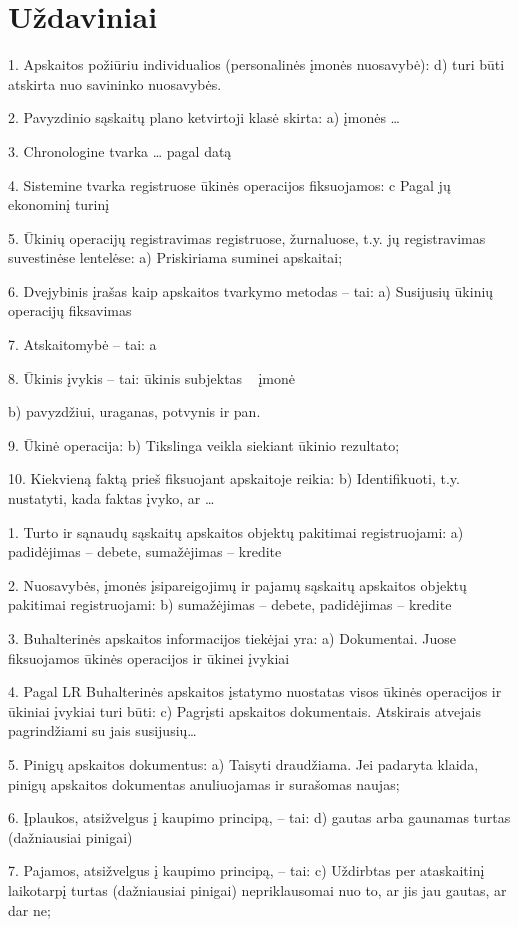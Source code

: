 \chapter{Uždaviniai}

1. Apskaitos požiūriu individualios (personalinės įmonės nuosavybė):
d) turi būti atskirta nuo savininko nuosavybės.

2. Pavyzdinio sąskaitų plano ketvirtoji klasė skirta:
a) įmonės …

3. Chronologine tvarka …
pagal datą

4. Sistemine tvarka registruose ūkinės operacijos fiksuojamos:
c Pagal jų ekonominį turinį

5. Ūkinių operacijų registravimas registruose, žurnaluose, t.y. jų
registravimas suvestinėse lentelėse:
a) Priskiriama suminei apskaitai;

6. Dvejybinis įrašas kaip apskaitos tvarkymo metodas – tai:
a) Susijusių ūkinių operacijų fiksavimas

7. Atskaitomybė – tai:
a

8. Ūkinis įvykis – tai:
ūkinis subjektas ~ įmonė

b) pavyzdžiui, uraganas, potvynis ir pan.

9. Ūkinė operacija:
b) Tikslinga veikla siekiant ūkinio rezultato;

10. Kiekvieną faktą prieš fiksuojant apskaitoje reikia:
b) Identifikuoti, t.y. nustatyti, kada faktas įvyko, ar …


1. Turto ir sąnaudų sąskaitų apskaitos objektų pakitimai registruojami:
a) padidėjimas – debete, sumažėjimas – kredite

2. Nuosavybės, įmonės įsipareigojimų ir pajamų sąskaitų apskaitos objektų
pakitimai registruojami:
b) sumažėjimas – debete, padidėjimas – kredite

3. Buhalterinės apskaitos informacijos tiekėjai yra:
a) Dokumentai. Juose fiksuojamos ūkinės operacijos ir ūkinei įvykiai

4. Pagal LR Buhalterinės apskaitos įstatymo nuostatas visos ūkinės
operacijos ir ūkiniai įvykiai turi būti:
c) Pagrįsti apskaitos dokumentais. Atskirais atvejais pagrindžiami su jais
susijusių…

5. Pinigų apskaitos dokumentus:
a) Taisyti draudžiama. Jei padaryta klaida, pinigų apskaitos dokumentas
anuliuojamas ir surašomas naujas;

6. Įplaukos, atsižvelgus į kaupimo principą, – tai:
d) gautas arba gaunamas turtas (dažniausiai pinigai)

7. Pajamos, atsižvelgus į kaupimo principą, – tai:
c) Uždirbtas per ataskaitinį laikotarpį turtas (dažniausiai pinigai)
nepriklausomai nuo to, ar jis jau gautas, ar dar ne;

